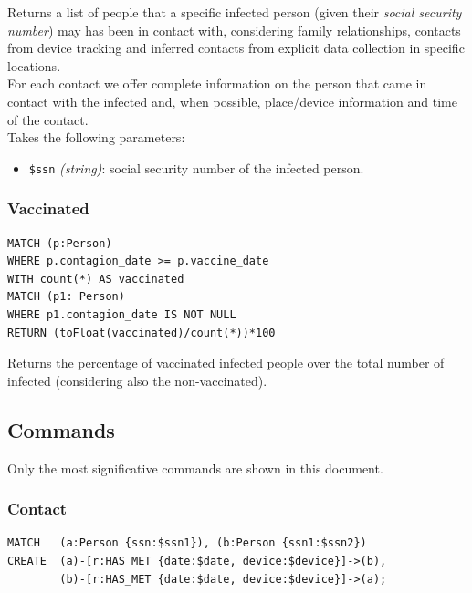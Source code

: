 \documentclass[12pt, a4paper]{article}
\begin{document}
\noindent %
Returns a list of people that a specific infected person (given their 
\emph{social security number}) may has been in contact with, considering 
family relationships, contacts from device tracking and inferred contacts from
explicit data collection in specific locations. \\
For each contact we offer complete information on the person that came in 
contact with the infected and, when possible, place/device information and 
time of the contact. \\
Takes the following parameters: 
\begin{itemize}
    \item \texttt{\$ssn} \emph{(string)}: social security number of the 
        infected person.
\end{itemize}

\subsubsection{Vaccinated}

\begin{tcolorbox}[fontupper=\scriptsize]
    \begin{verbatim}
MATCH (p:Person)
WHERE p.contagion_date >= p.vaccine_date
WITH count(*) AS vaccinated
MATCH (p1: Person)
WHERE p1.contagion_date IS NOT NULL
RETURN (toFloat(vaccinated)/count(*))*100
    \end{verbatim}
\end{tcolorbox}

\noindent %
Returns the percentage of vaccinated infected people over the total 
number of infected (considering also the non-vaccinated).


\subsection{Commands}

Only the most significative commands are shown in this document.

\subsubsection{Contact}

\begin{tcolorbox}[fontupper=\scriptsize]
    \begin{verbatim}
MATCH   (a:Person {ssn:$ssn1}), (b:Person {ssn1:$ssn2})
CREATE  (a)-[r:HAS_MET {date:$date, device:$device}]->(b), 
        (b)-[r:HAS_MET {date:$date, device:$device}]->(a);
    \end{verbatim}
\end{tcolorbox}
\end{document}
